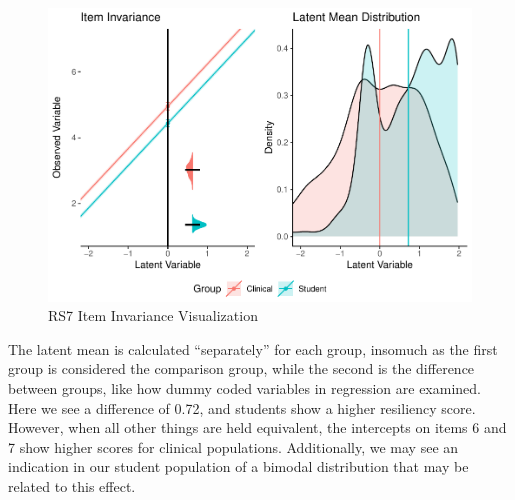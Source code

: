 \documentclass[
  man]{apa7}
\newenvironment{Shaded}{\begin{snugshade}}{\end{snugshade}}
\newcommand{\AttributeTok}[1]{\textcolor[rgb]{0.77,0.63,0.00}{#1}}
\newcommand{\CommentTok}[1]{\textcolor[rgb]{0.56,0.35,0.01}{\textit{#1}}}
\newcommand{\DecValTok}[1]{\textcolor[rgb]{0.00,0.00,0.81}{#1}}
\newcommand{\FloatTok}[1]{\textcolor[rgb]{0.00,0.00,0.81}{#1}}
\newcommand{\FunctionTok}[1]{\textcolor[rgb]{0.00,0.00,0.00}{#1}}
\newcommand{\NormalTok}[1]{#1}
\newcommand{\SpecialCharTok}[1]{\textcolor[rgb]{0.00,0.00,0.00}{#1}}
\newcommand{\StringTok}[1]{\textcolor[rgb]{0.31,0.60,0.02}{#1}}
\begin{document}
\begin{Shaded}
\end{Shaded}

\normalsize

\begin{figure}
\centering
\includegraphics{manuscript_files/figure-latex/rs7-img-1.pdf}
\caption{\label{fig:rs7-img}RS7 Item Invariance Visualization}
\end{figure}

The latent mean is calculated ``separately'' for each group, insomuch as the first group is considered the comparison group, while the second is the difference between groups, like how dummy coded variables in regression are examined. Here we see a difference of 0.72, and students show a higher resiliency score. However, when all other things are held equivalent, the intercepts on items 6 and 7 show higher scores for clinical populations. Additionally, we may see an indication in our student population of a bimodal distribution that may be related to this effect.
\end{document}
